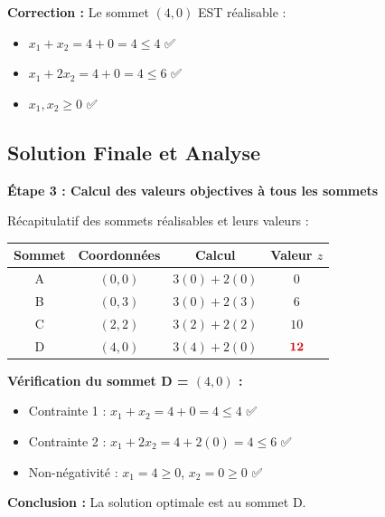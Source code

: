 \documentclass[12pt,a4paper]{article}
\begin{document}
\begin{remarque}
\textbf{Correction :} Le sommet $(4,0)$ EST réalisable :
\begin{itemize}
    \item $x_1 + x_2 = 4 + 0 = 4 \leq 4$ ✅
    \item $x_1 + 2x_2 = 4 + 0 = 4 \leq 6$ ✅
    \item $x_1, x_2 \geq 0$ ✅
\end{itemize}
\end{remarque}

\newpage
\subsection{Solution Finale et Analyse}

\begin{solution}
\textbf{Étape 3 : Calcul des valeurs objectives à tous les sommets}

Récapitulatif des sommets réalisables et leurs valeurs :

\begin{center}
\begin{tabular}{|c|c|c|c|}
\hline
\textbf{Sommet} & \textbf{Coordonnées} & \textbf{Calcul} & \textbf{Valeur $z$} \\
\hline
A & $(0, 0)$ & $3(0) + 2(0)$ & $0$ \\
\hline
B & $(0, 3)$ & $3(0) + 2(3)$ & $6$ \\
\hline
C & $(2, 2)$ & $3(2) + 2(2)$ & $10$ \\
\hline
D & $(4, 0)$ & $3(4) + 2(0)$ & $\textcolor{importantrouge}{\mathbf{12}}$ \\
\hline
\end{tabular}
\end{center}

\textbf{Vérification du sommet D = $(4, 0)$ :}
\begin{itemize}
    \item Contrainte 1 : $x_1 + x_2 = 4 + 0 = 4 \leq 4$ ✅
    \item Contrainte 2 : $x_1 + 2x_2 = 4 + 2(0) = 4 \leq 6$ ✅
    \item Non-négativité : $x_1 = 4 \geq 0$, $x_2 = 0 \geq 0$ ✅
\end{itemize}

\textcolor{importantrouge}{\textbf{Conclusion :}} La solution optimale est au sommet D.
\end{solution}
\end{document}
